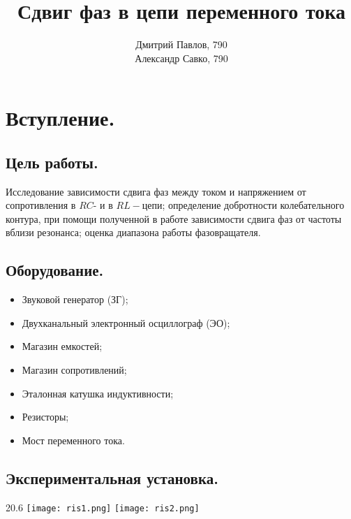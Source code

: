 \documentclass[12pt,a4paper]{article}
\author{Дмитрий Павлов, 790 \\  Александр Савко, 790}
\title {\textbf{Сдвиг фаз в цепи переменного тока}}
\begin{document}
\maketitle
\newpage
\tableofcontents 

\newpage

\section{Вступление.}
    \subsection{Цель работы.}
        Исследование зависимости сдвига фаз между током и напряжением от сопротивления в $RC$- и в $RL-$цепи; определение добротности колебательного контура, при помощи полученной в работе зависимости сдвига фаз от частоты вблизи резонанса; оценка диапазона работы фазовращателя.
        
    \subsection{Оборудование.}
        \begin{itemize}
            \item Звуковой генератор (ЗГ);
            \item Двухканальный электронный осциллограф (ЭО);
            \item Магазин емкостей;
            \item Магазин сопротивлений;
            \item Эталонная катушка индуктивности;
            \item Резисторы;
            \item Мост переменного тока.
        \end{itemize}

    \subsection{Экспериментальная установка.}
         \begin{wrapfigure}{2}{0.6\linewidth}
        	\texttt{[image: ris1.png]}
        	\hspace{44pt}{Рисунок 1 -- Схема для исследования сдвига фаз между током и напряжением в цепи переменного тока.}
        	\texttt{[image: ris2.png]}
        	\hspace{44pt}{Рисунок 2 -- Схема фазовращателя.}
        \end{wrapfigure}
        
\end{document}
